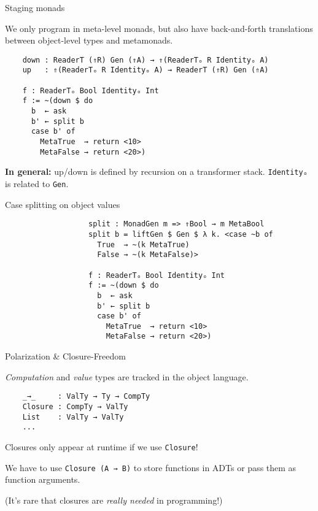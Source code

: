 \documentclass[dvipsnames,aspectratio=169]{beamer}
\newcommand{\ttt}[1]{{\texttt{#1}}}
\theoremstyle{remark}
\begin{document}
\begin{frame}[fragile]{Staging monads}

We only program in meta-level monads, but also have back-and-forth
translations between object-level types and metamonads.

\begin{verbatim}
    down : ReaderT (⇑R) Gen (⇑A) → ⇑(ReaderTₒ R Identityₒ A)
    up   : ⇑(ReaderTₒ R Identityₒ A) → ReaderT (⇑R) Gen (⇑A)

    f : ReaderTₒ Bool Identityₒ Int
    f := ~(down $ do
      b  ← ask
      b' ← split b
      case b' of
        MetaTrue  → return <10>
        MetaFalse → return <20>)
\end{verbatim}

\begin{block}{}
\textbf{In general:} up/down is defined by recursion on a transformer stack.
\alert{\ttt{Identityₒ} is related to \ttt{Gen}.}
\end{block}
\end{frame}

\begin{frame}[fragile]{Case splitting on object values}

\begin{verbatim}
                   split : MonadGen m => ⇑Bool → m MetaBool
                   split b = liftGen $ Gen $ λ k. <case ~b of
                     True  → ~(k MetaTrue)
                     False → ~(k MetaFalse)>

                   f : ReaderTₒ Bool Identityₒ Int
                   f := ~(down $ do
                     b  ← ask
                     b' ← split b
                     case b' of
                       MetaTrue  → return <10>
                       MetaFalse → return <20>)
\end{verbatim}

\end{frame}

\begin{frame}[fragile]{Polarization \& Closure-Freedom}

\emph{Computation} and \emph{value} types are tracked
in the object language.
\begin{verbatim}
    _→_     : ValTy → Ty → CompTy
    Closure : CompTy → ValTy
    List    : ValTy → ValTy
    ...
\end{verbatim}

Closures only appear at runtime if we use \texttt{Closure}!
\vspace{1em}

We have to use \ttt{Closure (A → B)} to store functions in ADTs
or pass them as function arguments.
\vspace{1em}

(It's rare that closures are \emph{really needed} in programming!)

\end{frame}
\end{document}
